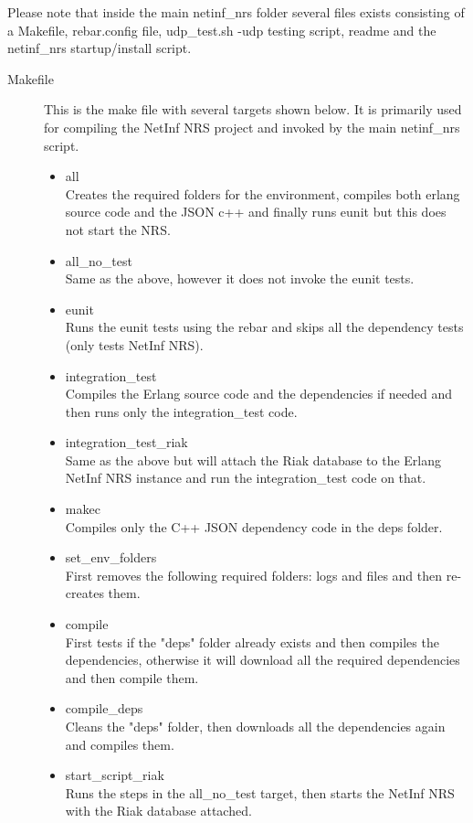 Please note that inside the main netinf\_nrs folder several files exists consisting of a Makefile, rebar.config file, udp\_test.sh -udp 
testing script, readme and the netinf\_nrs startup/install script. 

\begin{description}
\item[Makefile]
This is the make file with several targets shown below. It is primarily used for compiling the NetInf NRS project and invoked by the 
main netinf\_nrs script. 
\begin{itemize}
\item all \\
Creates the required folders for the environment, compiles both erlang source code and the JSON c++ and finally runs eunit but this 
does not start the NRS.
\item all\_no\_test \\
Same as the above, however it does not invoke the eunit tests.
\item eunit \\
Runs the eunit tests using the rebar and skips all the dependency tests (only tests NetInf NRS).
\item integration\_test \\
Compiles the Erlang source code and the dependencies if needed and then runs only the integration\_test code.
\item integration\_test\_riak \\
Same as the above but will attach the Riak database to the Erlang NetInf NRS instance and run the integration\_test code on that.
\item makec \\
Compiles only the C++ JSON dependency code in the deps folder. 
\item set\_env\_folders \\
First removes the following required folders: logs and files and then re-creates them.
\item compile \\
First tests if the "deps" folder already exists and then compiles the dependencies, otherwise it will download all the required dependencies 
and then compile them.
\item compile\_deps \\
Cleans the "deps" folder, then downloads all the dependencies again and compiles them.
\item start\_script\_riak \\
Runs the steps in the all\_no\_test target, then starts the NetInf NRS with the Riak database attached.

\end{itemize}
\end{description}
